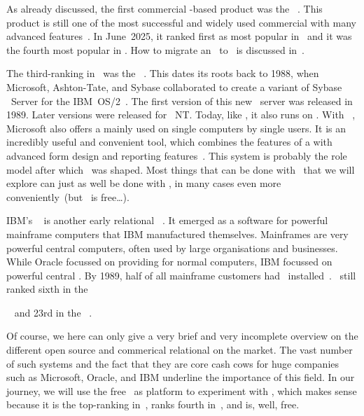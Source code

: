 As already discussed, the first commercial -based product was the \oracleDB~\cite{C20245YOQ,O2007OTHTMIMIOHWCFTPWMIH}.
This product is still one of the most successful and widely used commercial  with many advanced features~\cite{BBDDSY2011ADOODM,KK2021EODATASFHPAP}.
In June~2025, it ranked first as most popular  in~\cite{RS2025DERORD} and it was the fourth most popular  in \cite{PMPVEPWGSMB2025ATAODMSTTHOOSP}.
How to migrate an \oracleDB\ to \postgresql\ is discussed in~\cite{KO2023DMFOTP}.

The third-ranking  in~\cite{RS2025DERORD} was the \microsoftSqlServer~\cite{P2020MSS2ABG,A2024TSAFMSS2,W2018MSSDB}.
This  dates its roots back to 1988, when Microsoft, Ashton-Tate, and Sybase collaborated to create a variant of Sybase \sql\ Server for the  IBM~OS/2~\cite{W2018MSSDB:TEOMSS}.
The first version of this new \db\ server was released in 1989.
Later versions were released for \microsoftWindows~NT.
Today, like \oracleDB, it also runs on \linux.
With \microsoftAccess~\cite{LF2022MOSBSO2AM3}, Microsoft also offers a  mainly used on single computers by single users.
It is an incredibly useful and convenient tool, which combines the features of a  with advanced form design and reporting features~\cite{SSI2023MA2BTA,B2020HOMA2,UC2021AFD,MM2014RDAMA}.
This system is probably the role model after which \libreofficeBase\ was shaped.
Most things that can be done with \libreofficeBase\ that we will explore can just as well be done with \microsoftAccess, in many cases even more conveniently~(but \libreofficeBase\ is free\dots).

IBM's \ibmDB~\cite{CWDS2007UDLVWE,BBBCCDMMP2016SPTAFOIDFI} is another early relational \dbms~\cite{HS2013THAGOID}.
It emerged as a software for powerful mainframe computers that IBM manufactured themselves.
Mainframes are very powerful central computers, often used by large organisations and businesses.
While Oracle focussed on providing  for normal computers, IBM focussed on powerful central .
By 1989, half of all mainframe customers had \ibmDB\ installed~\cite{HS2013THAGOID}.
\ibmDB\ still ranked sixth in the~\begin{noglslink}\end{noglslink}~\cite{RS2025DERORD} and 23rd in the ~\cite{SE:SO:2024DS}.%
%
\endhsection%

Of course, we here can only give a very brief and very incomplete overview on the different open source and commerical relational  on the market.
The vast number of such systems and the fact that they are core cash cows for huge companies such as Microsoft, Oracle, and IBM underline the importance of this field.
In our journey, we will use the free \postgresql\ as platform to experiment with , which makes sense because it is the top-ranking  in~\cite{SE:SO:2024DS}, ranks fourth in~\cite{RS2025DERORD}, and is, well, free.%
%
\endhsection%
%
